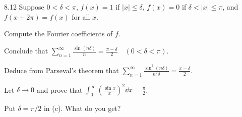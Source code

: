 \documentclass[11pt, oneside]{article}
\begin{document}
\begin{exercise}{8.12}
Suppose $0<\delta<\pi$, $f(x)=1$ if $|x|\le\delta$, $f(x)=0$ if $\delta<|x|\le\pi$, and $f(x+2\pi)=f(x)$ for all $x$.
\begin{exercisesubparts}
\item Compute the Fourier coefficients of $f$.
\item Conclude that $\displaystyle\sum_{n=1}^\infty\frac{\sin(n\delta)}n=\frac{\pi-\delta}{2}\quad(0<\delta<\pi)$.
\item Deduce from Parseval's theorem that $\displaystyle\sum_{n=1}^\infty\frac{\sin^2(n\delta)}{n^2\delta}=\frac{\pi-\delta}{2}$.
\item Let $\delta\to0$ and prove that $\displaystyle\int_0^\infty\left(\frac{\sin x}{x}\right)^2\dd x=\frac\pi2$.
\item Put $\delta=\pi/2$ in (c). What do you get?
\end{exercisesubparts}
\end{exercise}
\end{document}
